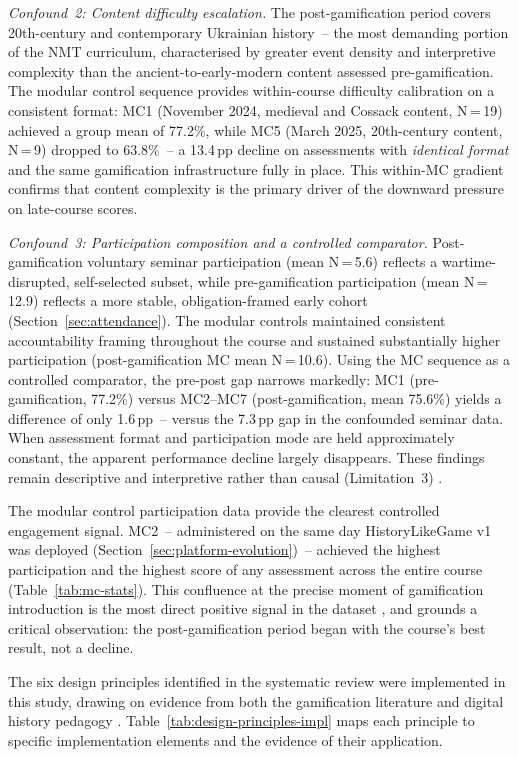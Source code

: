 \textit{Confound~2: Content difficulty escalation.} The post-gamification period covers 20th-century and contemporary Ukrainian history~-- the most demanding portion of the NMT curriculum, characterised by greater event density and interpretive complexity than the ancient-to-early-modern content assessed pre-gamification. The modular control sequence provides within-course difficulty calibration on a consistent format: MC1 (November 2024, medieval and Cossack content, N\,=\,19) achieved a group mean of 77.2\%, while MC5 (March 2025, 20th-century content, N\,=\,9) dropped to 63.8\%~-- a 13.4\,pp decline on assessments with \emph{identical format} and the same gamification infrastructure fully in place. This within-MC gradient confirms that content complexity is the primary driver of the downward pressure on late-course scores.

\textit{Confound~3: Participation composition and a controlled comparator.} Post-gamification voluntary seminar participation (mean N\,=\,5.6) reflects a wartime-disrupted, self-selected subset, while pre-gamification participation (mean N\,=\,12.9) reflects a more stable, obligation-framed early cohort (Section~\ref{sec:attendance}). The modular controls maintained consistent accountability framing throughout the course and sustained substantially higher participation (post-gamification MC mean N\,=\,10.6). Using the MC sequence as a controlled comparator, the pre-post gap narrows markedly: MC1 (pre-gamification, 77.2\%) versus MC2--MC7 (post-gamification, mean 75.6\%) yields a difference of only 1.6\,pp~-- versus the 7.3\,pp gap in the confounded seminar data. When assessment format and participation mode are held approximately constant, the apparent performance decline largely disappears. These findings remain descriptive and interpretive rather than causal (Limitation~3) \cite{creswell, Korniienko2025mrqs}.

The modular control participation data provide the clearest controlled engagement signal. MC2~-- administered on the same day HistoryLikeGame v1 was deployed (Section~\ref{sec:platform-evolution})~-- achieved the highest participation and the highest score of any assessment across the entire course (Table~\ref{tab:mc-stats}). This confluence at the precise moment of gamification introduction is the most direct positive signal in the dataset \cite{KorniienkoSemerikov2024}, and grounds a critical observation: the post-gamification period began with the course's best result, not a decline.

The six design principles identified in the systematic review \cite{KorniienkoSemerikov2024} were implemented in this study, drawing on evidence from both the gamification literature \cite{Sailer2017, Qian2016} and digital history pedagogy \cite{Korniienko2025cte}. Table~\ref{tab:design-principles-impl} maps each principle to specific implementation elements and the evidence of their application.

